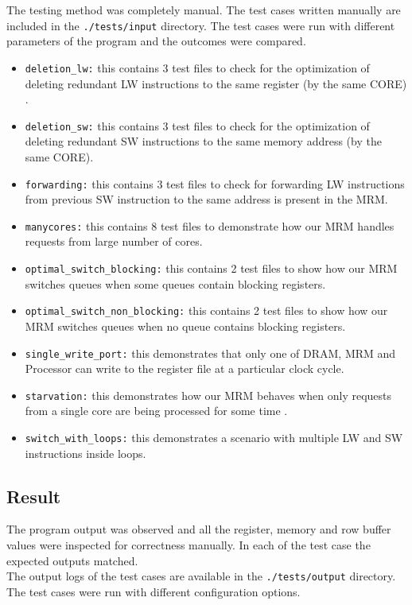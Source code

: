 \documentclass[hidelinks,12pt]{article}
\begin{document}
The testing method was completely manual. The test cases written manually are included in the \verb|./tests/input| directory. The test cases were run with different parameters
of the program and the outcomes were compared.
\begin{itemize}
    \item \verb|deletion_lw:| this contains 3 test files to check for the optimization of deleting redundant LW instructions to the same register (by the same CORE) .
    \item \verb|deletion_sw:| this contains 3 test files to check for the optimization of deleting redundant SW instructions to the same memory address (by the same CORE).
    \item \verb|forwarding:| this contains 3 test files to check for forwarding LW instructions from previous SW instruction to the same address is present in the MRM.
    \item \verb|manycores:| this contains 8 test files to demonstrate how our MRM handles requests from large number of cores.
    \item \verb|optimal_switch_blocking:| this contains 2 test files to show how our MRM switches queues when some queues contain blocking registers.
    \item \verb|optimal_switch_non_blocking:| this contains 2 test files to show how our MRM switches queues when no queue contains blocking registers.
    \item \verb|single_write_port:| this demonstrates that only one of DRAM, MRM and Processor can write to the register file at a particular clock cycle.
    \item \verb|starvation:| this demonstrates how our MRM behaves when only requests from a single core are being processed for some time  .
    \item \verb|switch_with_loops:| this demonstrates a scenario with multiple LW and SW instructions inside loops.
\end{itemize}

\subsection{Result}
The program output was observed and all the register, memory and row buffer values were inspected for correctness manually. In each of the test case the expected outputs matched.\\[0.2cm]
The output logs of the test cases are available in the \verb|./tests/output| directory. The test cases were run with different configuration options.
\end{document}
